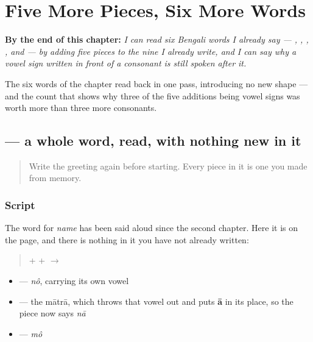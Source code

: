 
\chapter{Five More Pieces, Six More Words}
\label{ch:bn-pieces-into-words}

\begin{chapteropening}
\textbf{By the end of this chapter:} \emph{I can read six Bengali words I already say — , , , ,  and  — by adding five pieces to the nine I already write, and I can say why a vowel sign written in front of a consonant is still spoken after it.}

The six words of the chapter read back in one pass, introducing no new shape — and the count that shows why three of the five additions being vowel signs was worth more than three more consonants.
\end{chapteropening}

\section[nām]{ — a whole word, read, with nothing new in it}

\label{lesson:BN-W02-naam-read}



\begin{quote}
Write the greeting again before starting. Every piece in it is one you made from memory.
\end{quote}

\subsection*{Script}
The word for \emph{name} has been said aloud since the second chapter. Here it is on the page, and there is nothing in it you have not already written:

\begin{quote}
\textbf{} + \textbf{} + \textbf{} $\to$ \textbf{}
\end{quote}

\begin{itemize}
\raggedright
  \item \textbf{} — \emph{nô}, carrying its own vowel
  \item \textbf{} — the mātrā, which throws that vowel out and puts \textbf{ā} in its place, so the piece now says \emph{nā}
  \item \textbf{} — \emph{mô}
\end{itemize}

